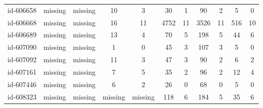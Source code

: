 \begin{tabular}{ccccccccccc}
id-606658 & missing & missing & 10 & 3 & 30 & 1 & 90 & 2 & 5 & 0\\
id-606668 & missing & missing & 16 & 11 & 4752 & 11 & 3526 & 11 & 516 & 10\\
id-606689 & missing & missing & 13 & 4 & 70 & 5 & 198 & 5 & 44 & 6\\
id-607090 & missing & missing & 1 & 0 & 45 & 3 & 107 & 3 & 5 & 0\\
id-607092 & missing & missing & 11 & 3 & 47 & 3 & 90 & 2 & 6 & 2\\
id-607161 & missing & missing & 7 & 5 & 35 & 2 & 96 & 2 & 12 & 4\\
id-607446 & missing & missing & 6 & 2 & 26 & 0 & 68 & 0 & 5 & 0\\
id-608323 & missing & missing & missing & missing & 118 & 6 & 184 & 5 & 35 & 6\\
\end{tabular}
